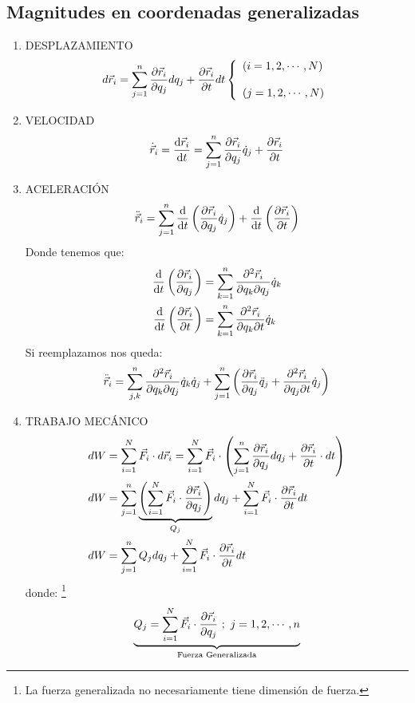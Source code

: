 \documentclass[../main]{subfiles}
\begin{document}
\subsection*{Magnitudes en coordenadas generalizadas}

\begin{enumerate}
    \item DESPLAZAMIENTO
    $$
    d\vec{r}_i=\sum_{j=1}^n \pdv{\vec{r}_i}{q_j}dq_j+\pdv{\vec{r}_i}{t}dt \left \{ \begin{array}{lcc}
             (i=1,2,\cdots, N)  \\
             \\ (j=1,2,\cdots, N)   
    \end{array} \right.
    $$
    \item VELOCIDAD
    $$
    \dot{\vec{r}}_i=\dv{\vec{r}_i}{t}=\sum_{j=1}^n \pdv{\vec{r}_i}{q_j} \dot{q}_j+\pdv{\vec{r}_i}{t}
    $$
    \item ACELERACIÓN
    $$
    \ddot{\vec{r}}_i=\sum_{j=1}^n \dv{}{t}\left( \pdv{\vec{r}_i}{q_j}\dot{q}_j\right)+\dv{}{t}\left( \pdv{\vec{r}_i}{t}\right) 
    $$
    Donde tenemos que:
    \begin{align*}
        \dv{}{t} \left( \pdv{\vec{r}_i}{q_j}\right)&=\sum_{k=1}^n \pdv{^2 \vec{r}_i}{q_k \partial q_j} \dot{q}_k \\
        \dv{}{t} \left( \pdv{\vec{r}_i}{t}\right)&=\sum_{k=1}^n \pdv{^2 \vec{r}_i}{q_k \partial t} \dot{q}_k
    \end{align*}
    Si reemplazamos nos queda:
    $$
    \ddot{\vec{r}}_i=\sum_{j,k}^n \pdv{^2 \vec{r}_i}{q_k \partial q_j} \dot{q}_k \dot{q}_j+\sum_{j=1}^n \left ( \pdv{\vec{r}_i}{q_j}\ddot{q}_j+\pdv{^2 \vec{r}_i}{q_j \partial t} \dot{q}_j \right)
    $$
    \item TRABAJO MECÁNICO
    \begin{align*}
        dW&=\sum_{i=1}^N \vec{F}_i \cdot d\vec{r}_i= \sum_{i=1}^N \vec{F}_i \cdot \left( \sum_{j=1}^n \pdv{\vec{r}_i}{q_j}dq_j+ \pdv{\vec{r}_i}{t}\cdot dt \right) \\
        dW&=\sum_{j=1}^n \underbrace{\left( \sum_{i=1}^N \vec{F}_i \cdot \pdv{\vec{r}_i}{q_j}
     \right)}_{Q_j}dq_j+\sum_{i=1}^N \vec{F}_i \cdot \pdv{\vec{r}_i}{t}dt \\
        dW&=\sum_{j=1}^n Q_j dq_j+\sum_{i=1}^N \vec{F}_i \cdot \pdv{\vec{r}_i}{t}dt
    \end{align*}
    donde: \footnote{La fuerza generalizada no necesariamente tiene dimensión de fuerza.}
    $$
    \underbrace{Q_j=\sum_{i=1}^N \vec{F}_i \cdot \pdv{\vec{r}_i}{q_j} \ ; \ j=1,2,\cdots,n}_{\text{Fuerza Generalizada}}
    $$ 
\end{enumerate}
\end{document}
